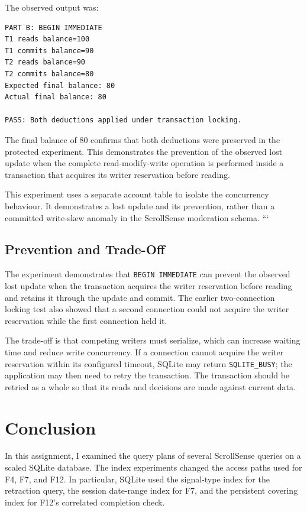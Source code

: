 \documentclass[11pt,a4paper]{article}
\begin{document}
The observed output was:

\begin{lstlisting}[style=textstyle]
PART B: BEGIN IMMEDIATE
T1 reads balance=100
T1 commits balance=90
T2 reads balance=90
T2 commits balance=80
Expected final balance: 80
Actual final balance: 80

PASS: Both deductions applied under transaction locking.
\end{lstlisting}

The final balance of 80 confirms that both deductions were
preserved in the protected experiment. This demonstrates the
prevention of the observed lost update when the complete
read-modify-write operation is performed inside a transaction
that acquires its writer reservation before reading.

This experiment uses a separate account table to isolate the
concurrency behaviour. It demonstrates a lost update and its
prevention, rather than a committed write-skew anomaly in the
ScrollSense moderation schema.
```

\subsection{Prevention and Trade-Off}

The experiment demonstrates that \texttt{BEGIN IMMEDIATE} can
prevent the observed lost update when the transaction acquires
the writer reservation before reading and retains it through the
update and commit. The earlier two-connection locking test also
showed that a second connection could not acquire the writer
reservation while the first connection held it.

The trade-off is that competing writers must serialize, which
can increase waiting time and reduce write concurrency. If a
connection cannot acquire the writer reservation within its
configured timeout, SQLite may return \texttt{SQLITE\_BUSY};
the application may then need to retry the transaction. The
transaction should be retried as a whole so that its reads and
decisions are made against current data.

\section{Conclusion}

In this assignment, I examined the query plans of several ScrollSense
queries on a scaled SQLite database. The index experiments changed
the access paths used for F4, F7, and F12. In particular, SQLite
used the signal-type index for the retraction query, the session
date-range index for F7, and the persistent covering index for
F12's correlated completion check.
\end{document}
